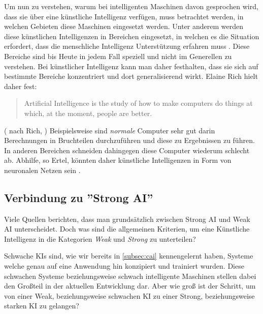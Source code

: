            Um nun zu verstehen, warum bei intelligenten Maschinen davon gesprochen wird, dass sie über eine
            künstliche Intelligenz verfügen, muss betrachtet werden, in welchen Gebieten diese Maschinen eingesetzt werden.
            Unter anderem werden diese künstlichen Intelligenzen in Bereichen eingesetzt, in welchen es die Situation
            erfordert, dass die menschliche Intelligenz Unterstützung erfahren muss \cite[s. 2]{ertel2016grundkurs}.
            Diese Bereiche sind bis Heute in jedem Fall speziell und nicht im Generellen zu verstehen. Bei künstlicher
            Intelligenz kann man daher festhalten, dass sie sich auf bestimmte Bereiche konzentriert und dort
            generalisierend wirkt. Elaine Rich hielt daher fest:
            \begin{quote}
                Artificial Intelligence is the study of how to make computers do things at which, at the moment, people are better.
            \end{quote}
            (\citeauthor{ertel2016grundkurs} nach Rich, \citeyear{ertel2016grundkurs})
            Beispielsweise sind \textit{normale} Computer sehr gut darin Berechnungen in Bruchteilen durchzuführen und diese zu
            Ergebnissen zu führen.\cite[s. 3]{ertel2016grundkurs}
            In anderen Bereichen schneiden dahingegen diese Computer wiederum schlecht ab. Abhilfe, so Ertel,
            könnten daher künstliche Intelligenzen in Form von neuronalen Netzen sein \citeyearpar{ertel2016grundkurs}.

        \subsection{Verbindung zu ''Strong AI''}
            Viele Quellen berichten, dass man grundsätzlich zwischen Strong AI und Weak AI unterscheidet.\cite{huang_beef}
            Doch was sind die allgemeinen Kriterien, um eine Künstliche Intelligenz in die Kategorien \textit{Weak}
            und \textit{Strong} zu unterteilen?

            Schwache KIs sind, wie wir bereits in \ref{subsec:cai} kennengelernt haben, Systeme welche genau auf
            eine Anwendung hin konzipiert und trainiert wurden. Diese schwachen Systeme beziehungsweise schwach
            intelligente Maschinen stellen dabei den Großteil in der aktuellen Entwicklung dar. \cite{brendel_2019}
            Aber wie groß ist der Schritt, um von einer Weak, beziehungsweise schwachen KI zu einer Strong,
            beziehungsweise starken KI zu gelangen?

